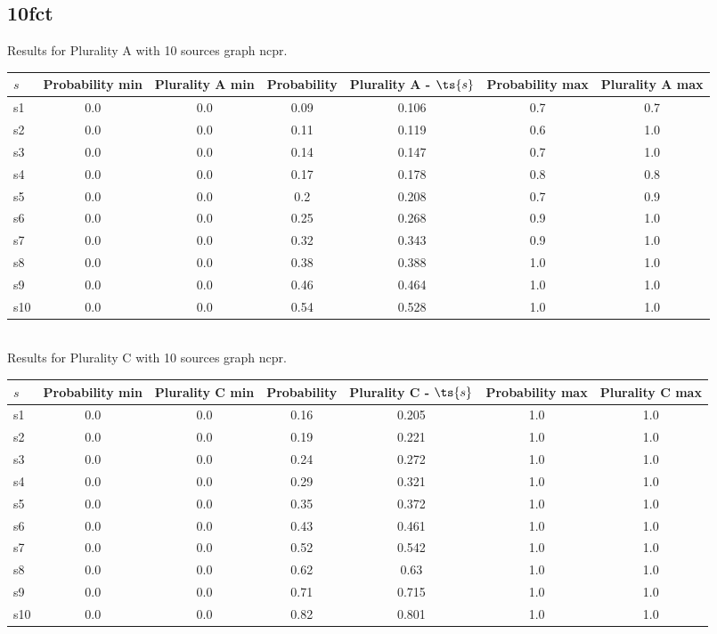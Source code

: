 \documentclass{article}
\begin{document}
\newpage

\subsection{10fct}

\noindent Results for Plurality A with 10 sources graph ncpr.

\noindent\begin{tabular}{|l|c|c|c|c|c|c|}
\hline
$s$& Probability min & Plurality A min & Probability & Plurality A - $\ts{s}$ & Probability max & Plurality A max\\
\hline
s1 &0.0 & 0.0 & 0.09 & 0.106 & 0.7 & 0.7\\
\hline
s2 &0.0 & 0.0 & 0.11 & 0.119 & 0.6 & 1.0\\
\hline
s3 &0.0 & 0.0 & 0.14 & 0.147 & 0.7 & 1.0\\
\hline
s4 &0.0 & 0.0 & 0.17 & 0.178 & 0.8 & 0.8\\
\hline
s5 &0.0 & 0.0 & 0.2 & 0.208 & 0.7 & 0.9\\
\hline
s6 &0.0 & 0.0 & 0.25 & 0.268 & 0.9 & 1.0\\
\hline
s7 &0.0 & 0.0 & 0.32 & 0.343 & 0.9 & 1.0\\
\hline
s8 &0.0 & 0.0 & 0.38 & 0.388 & 1.0 & 1.0\\
\hline
s9 &0.0 & 0.0 & 0.46 & 0.464 & 1.0 & 1.0\\
\hline
s10 &0.0 & 0.0 & 0.54 & 0.528 & 1.0 & 1.0\\
\hline
\end{tabular}\\

\noindent Results for Plurality C with 10 sources graph ncpr.

\noindent\begin{tabular}{|l|c|c|c|c|c|c|}
\hline
$s$& Probability min & Plurality C min & Probability & Plurality C - $\ts{s}$ & Probability max & Plurality C max\\
\hline
s1 &0.0 & 0.0 & 0.16 & 0.205 & 1.0 & 1.0\\
\hline
s2 &0.0 & 0.0 & 0.19 & 0.221 & 1.0 & 1.0\\
\hline
s3 &0.0 & 0.0 & 0.24 & 0.272 & 1.0 & 1.0\\
\hline
s4 &0.0 & 0.0 & 0.29 & 0.321 & 1.0 & 1.0\\
\hline
s5 &0.0 & 0.0 & 0.35 & 0.372 & 1.0 & 1.0\\
\hline
s6 &0.0 & 0.0 & 0.43 & 0.461 & 1.0 & 1.0\\
\hline
s7 &0.0 & 0.0 & 0.52 & 0.542 & 1.0 & 1.0\\
\hline
s8 &0.0 & 0.0 & 0.62 & 0.63 & 1.0 & 1.0\\
\hline
s9 &0.0 & 0.0 & 0.71 & 0.715 & 1.0 & 1.0\\
\hline
s10 &0.0 & 0.0 & 0.82 & 0.801 & 1.0 & 1.0\\
\hline
\end{tabular}\\
\end{document}
